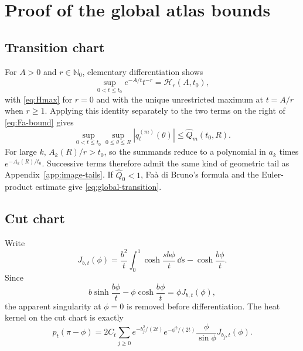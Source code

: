 \section{Proof of the global atlas bounds}\label{app:global-atlas}

\subsection*{Transition chart}
For $A>0$ and $r\in\mathbb N_0$, elementary differentiation shows
\[
 \sup_{0<t\le t_0}e^{-A/t}t^{-r}=\mathcal H_r(A,t_0),
\]
with \eqref{eq:Hmax} for $r=0$ and with the unique unrestricted maximum
at $t=A/r$ when $r\ge1$.  Applying this identity separately to the two
terms on the right of \eqref{eq:Fa-bound} gives
\[
 \sup_{0<t\le t_0}\sup_{0\le\theta\le R}|q_t^{(m)}(\theta)|
 \le \widehat Q_m(t_0,R).
\]
For large $k$, $A_k(R)/r>t_0$, so the summands reduce to a polynomial in
$a_k$ times $e^{-A_k(R)/t_0}$.  Successive terms therefore admit the same
kind of geometric tail as Appendix~\ref{app:image-tails}.  If
$\widehat Q_0<1$, Fa\`a di Bruno's formula and the Euler-product estimate
give \eqref{eq:global-transition}.

\subsection*{Cut chart}
Write
\begin{equation}\label{eq:Jbt}
 J_{b,t}(\phi)=\frac{b^2}{t}\int_0^1
 \cosh\frac{sb\phi}{t}\,\dd s-\cosh\frac{b\phi}{t}.
\end{equation}
Since
\[
 b\sinh\frac{b\phi}{t}-\phi\cosh\frac{b\phi}{t}
 =\phi J_{b,t}(\phi),
\]
the apparent singularity at $\phi=0$ is removed before differentiation.
The heat kernel on the cut chart is exactly
\begin{equation}\label{eq:cut-sum-regular}
 p_t(\pi-\phi)=2C_t\sum_{j\ge0}e^{-b_j^2/(2t)}
 e^{-\phi^2/(2t)}\frac{\phi}{\sin\phi}J_{b_j,t}(\phi).
\end{equation}

